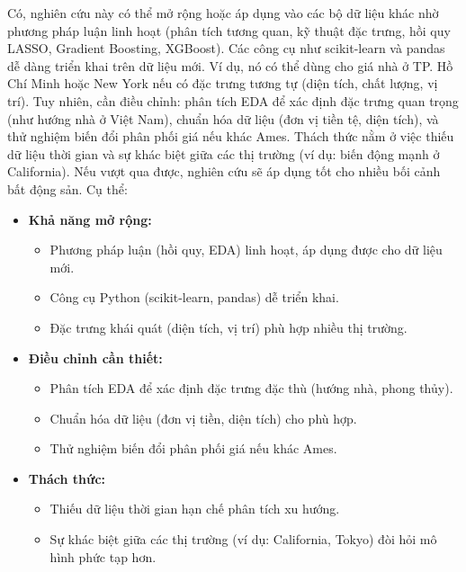 Có, nghiên cứu này có thể mở rộng hoặc áp dụng vào các bộ dữ liệu khác nhờ phương pháp luận linh hoạt (phân tích tương quan, kỹ thuật đặc trưng, hồi quy LASSO, Gradient Boosting, XGBoost). Các công cụ như scikit-learn và pandas dễ dàng triển khai trên dữ liệu mới. Ví dụ, nó có thể dùng cho giá nhà ở TP. Hồ Chí Minh hoặc New York nếu có đặc trưng tương tự (diện tích, chất lượng, vị trí). Tuy nhiên, cần điều chỉnh: phân tích EDA để xác định đặc trưng quan trọng (như hướng nhà ở Việt Nam), chuẩn hóa dữ liệu (đơn vị tiền tệ, diện tích), và thử nghiệm biến đổi phân phối giá nếu khác Ames. Thách thức nằm ở việc thiếu dữ liệu thời gian và sự khác biệt giữa các thị trường (ví dụ: biến động mạnh ở California). Nếu vượt qua được, nghiên cứu sẽ áp dụng tốt cho nhiều bối cảnh bất động sản. Cụ thể:
\begin{itemize}
    \item \textbf{Khả năng mở rộng:} 
    \begin{itemize}
        \item Phương pháp luận (hồi quy, EDA) linh hoạt, áp dụng được cho dữ liệu mới.
        \item Công cụ Python (scikit-learn, pandas) dễ triển khai.
        \item Đặc trưng khái quát (diện tích, vị trí) phù hợp nhiều thị trường.
    \end{itemize}
    \item \textbf{Điều chỉnh cần thiết:} 
    \begin{itemize}
        \item Phân tích EDA để xác định đặc trưng đặc thù (hướng nhà, phong thủy).
        \item Chuẩn hóa dữ liệu (đơn vị tiền, diện tích) cho phù hợp.
        \item Thử nghiệm biến đổi phân phối giá nếu khác Ames.
    \end{itemize}
    \item \textbf{Thách thức:} 
    \begin{itemize}
        \item Thiếu dữ liệu thời gian hạn chế phân tích xu hướng.
        \item Sự khác biệt giữa các thị trường (ví dụ: California, Tokyo) đòi hỏi mô hình phức tạp hơn.
    \end{itemize}
\end{itemize}